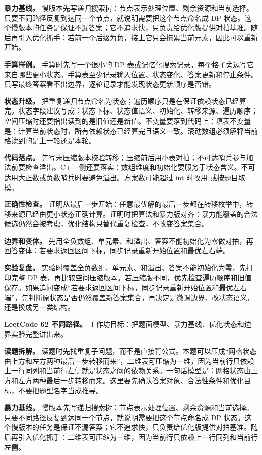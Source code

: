 \textbf{暴力基线。} 慢版本先写递归搜索树：节点表示处理位置、剩余资源和当前选择。只要不同路径反复到达同一个节点，就说明需要把这个节点命名成 DP 状态。这个慢版本的任务是保证不漏答案；它不追求快，只负责给优化版提供对拍基准。随后再引入优化抓手：若前一个后缀为负，接上它只会拖累当前元素，因此可以重新开始。

\textbf{手算样例。} 手算时先写一个很小的 DP 表或记忆化搜索记录。每个格子旁边写它来自哪些更小状态。手算表至少记录输入位置、状态变化、答案更新和停止条件。只写最终答案看不出边界，逐轮记录才能发现状态更新顺序是否错。

\textbf{状态升级。} 把重复递归节点命名为状态；遍历顺序只是在保证依赖状态已经算完。状态字段建议写成：状态下标、状态值语义、初始化、转移来源、遍历顺序；空间压缩时还要指出读到的是旧值还是新值。不变量要落到代码上：填表不变量是：计算当前状态时，所有依赖状态已经算完且语义一致。滚动数组必须解释当前格读到的是上一轮还是本轮。

\textbf{代码落点。} 先写未压缩版本校验转移；压缩前后用小表对拍；不可达哨兵参与加法前要检查溢出。C++ 侧还要落实：数组维度和初始化要服务于状态含义。不可达用大正数或负数哨兵时要避免溢出。方案数可能超过 int 时改用  或按题目取模。

\textbf{正确性检查。} 证明从最后一步开始：任意最优解的最后一步都在转移枚举中，转移来源已经由更小状态正确计算。证明时把算法和暴力版对齐：暴力能覆盖的合法候选仍然会被考虑，优化结构只替代重复检查，不改变答案集合。

\textbf{边界和变体。} 先用全负数组、单元素、和溢出、答案不能初始化为零做对拍，再回答变体：若要求返回区间下标，同步记录重新开始位置和最优左右端。

\textbf{实验复盘。} 实验时覆盖全负数组、单元素、和溢出、答案不能初始化为零，先打印完整 DP 表，再比较空间压缩版本。若压缩版不同，优先检查遍历顺序和旧值保存。如果追问变成“若要求返回区间下标，同步记录重新开始位置和最优左右端”，先判断原状态是否仍然覆盖新答案集合，再决定是微调边界、改状态语义，还是换成另一类结构。

\noindent\textbf{LeetCode 62 不同路径。} 工作坊目标：把题面模型、暴力基线、优化状态和边界实验完整讲出来。

\textbf{读题拆解。} 读题时先找重复子问题，而不是直接背公式。本题可以压成“网格状态由上方和左方两种最后一步转移而来”，二维表可压缩为一维，因为当前行只依赖上一行同列和当前行左侧就是状态之间的依赖关系。一句话模型是：网格状态由上方和左方两种最后一步转移而来。这里要先确认答案对象、合法性条件和优化目标，不要把题型名字当成推导。

\textbf{暴力基线。} 慢版本先写递归搜索树：节点表示处理位置、剩余资源和当前选择。只要不同路径反复到达同一个节点，就说明需要把这个节点命名成 DP 状态。这个慢版本的任务是保证不漏答案；它不追求快，只负责给优化版提供对拍基准。随后再引入优化抓手：二维表可压缩为一维，因为当前行只依赖上一行同列和当前行左侧。

